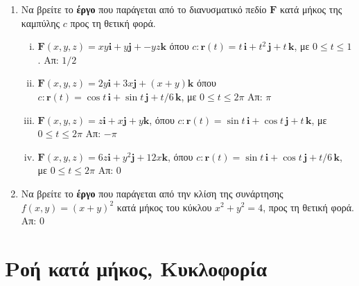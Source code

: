 \begin{enumerate}
  \item Να βρείτε το \textbf{έργο} που παράγεται από το διανυσματικό πεδίο 
    $ \mathbf{F} $ κατά μήκος της καμπύλης $c$ προς τη θετική φορά.
    \begin{enumerate}[i)]
      \item $ \mathbf{F}(x,y,z) = xy \mathbf{i} + y \mathbf{j} + -yz \mathbf{k}
        $ όπου $ c \colon \mathbf{r}(t)=t\, \mathbf{i} + t^{2}\, \mathbf{j} + t \,
        \mathbf{k}$, με $ 0 \leq t \leq 1 $. 
        \hfill Απ: $ 1/2 $ 
      \item $ \mathbf{F}(x,y,z) = 2y \mathbf{i} + 3x \mathbf{j} + (x+y) \mathbf{k}
        $ όπου $ c \colon \mathbf{r}(t)= \cos{t}\, \mathbf{i} + \sin{t}\, 
        \mathbf{j} + t/6 \, \mathbf{k} $, με $ 0 \leq t \leq 2 \pi $ 
        \hfill Απ: $ \pi $ 
      \item $ \mathbf{F}(x,y,z) = z \mathbf{i} + x \mathbf{j} + y \mathbf{k}
        $, όπου $ c \colon \mathbf{r}(t)= \sin{t}\, \mathbf{i} + \cos{t}\, 
        \mathbf{j} + t \, \mathbf{k}$, με $ 0 \leq t \leq 2 \pi $ 
        \hfill Απ: $ - \pi $  
      \item $ \mathbf{F}(x,y,z) = 6z \mathbf{i} + y^{2} \mathbf{j} + 12 x \mathbf{k}
        $, όπου $ c \colon \mathbf{r}(t)= \sin{t}\, \mathbf{i} + \cos{t}\, 
        \mathbf{j} + t/6 \, \mathbf{k}$, με $ 0 \leq t \leq 2 \pi $ 
        \hfill Απ: 0  
    \end{enumerate}

  \item Να βρείτε το \textbf{έργο} που παράγεται από την κλίση της συνάρτησης 
    $ f(x,y) = (x+y)^{2} $ κατά μήκος του κύκλου $ x^{2}+y^{2}=4 $, προς τη θετική φορά. 
    \hfill Απ: 0  
\end{enumerate}


\section*{Ροή κατά μήκος, Κυκλοφορία}

